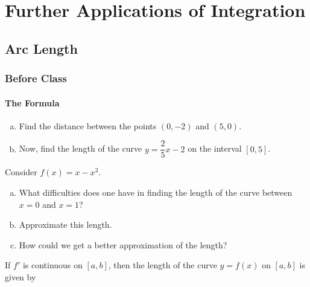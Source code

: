 \documentclass[notes]{subfiles}
\begin{document}
	\chapter{Further Applications of Integration}
	\fancyhead[LO,RE]{\bfseries \small \currentname}
	\fancyfoot[C]{{}}
	\fancyfoot[RO,LE]{\large \thepage}	%
	
\section*{Arc Length}\label{cs81}
	\subsection*{Before Class}
	\subsubsection*{The Formula}
		\begin{ex}
			\begin{enumerate}[(a)]
				\item Find the distance between the points $(0,-2)$ and $(5,0)$.
					
				\item Now, find the length of the curve $y = \dfrac{2}{5}x - 2$ on the interval $[0,5]$.
			\end{enumerate}
		\end{ex}
		
		\begin{ex}
			Consider $f(x) = x-x^2$.  
			\begin{enumerate}[(a)]
				\item What difficulties does one have in finding the length of the curve between $x = 0$ and $x = 1$?
					\vs{.5}
					
				\item Approximate this length.
					\vs{1}
				
				\item How could we get a better approximation of the length?
					\vs{1}
			\end{enumerate}
		\end{ex}
			\newpage
			
		\begin{rmk}
			If $f'$ is continuous on $[a,b]$, then the length of the curve $y = f(x)$ on $[a,b]$ is given by\\[30pt]
		\end{rmk}
		\begin{pf}
			$ $
		\end{pf}
			\newpage
			
\end{document}

